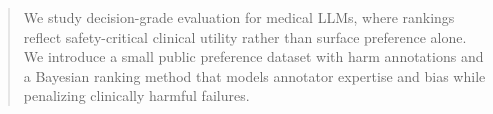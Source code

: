 \begin{abstract}
We study decision-grade evaluation for medical LLMs, where rankings reflect safety-critical clinical utility rather than surface preference alone. We introduce a small public preference dataset with harm annotations and a Bayesian ranking method that models annotator expertise and bias while penalizing clinically harmful failures.
\end{abstract}
